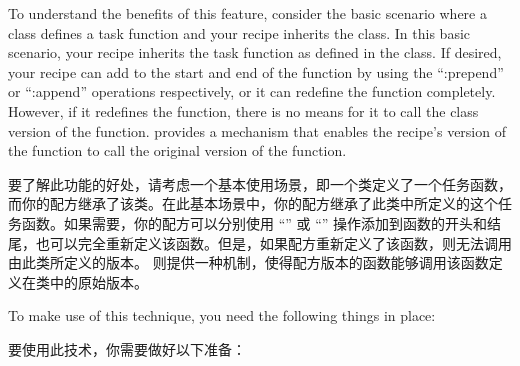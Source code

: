 To understand the benefits of this feature, consider the basic scenario where a class defines a task function and your recipe inherits the class. In this basic scenario, your recipe inherits the task function as defined in the class. If desired, your recipe can add to the start and end of the function by using the ``:prepend'' or ``:append'' operations respectively, or it can redefine the function completely. However, if it redefines the function, there is no means for it to call the class version of the function.  provides a mechanism that enables the recipe's version of the function to call the original version of the function.

要了解此功能的好处，请考虑一个基本使用场景，即一个类定义了一个任务函数，而你的配方继承了该类。在此基本场景中，你的配方继承了此类中所定义的这个任务函数。如果需要，你的配方可以分别使用 ``'' 或 ``'' 操作添加到函数的开头和结尾，也可以完全重新定义该函数。但是，如果配方重新定义了该函数，则无法调用由此类所定义的版本。 则提供一种机制，使得配方版本的函数能够调用该函数定义在类中的原始版本。

To make use of this technique, you need the following things in place:

要使用此技术，你需要做好以下准备：

